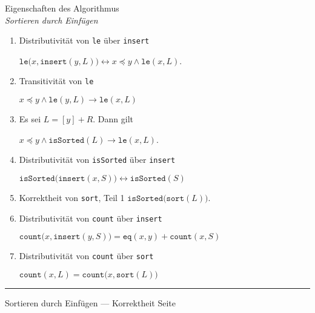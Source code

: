 \documentclass{slides}
\newcounter{mypage}
\begin{document}
\begin{slide}{}
\normalsize

\begin{center}
Eigenschaften des Algorithmus \\ \emph{Sortieren durch Einf\"ugen}
\end{center}
\vspace*{0.5cm}

\footnotesize
\begin{enumerate}
\item Distributivit\"at von \texttt{le} \"uber \texttt{insert}

      $\mathtt{le}\bigl(x, \mathtt{insert}(y,L) \bigr) \leftrightarrow x \preceq y \wedge \mathtt{le}(x,L)$. 
\item Transitivit\"at von \texttt{le}

      $x \preceq y \wedge \mathtt{le}(y,L) \rightarrow \mathtt{le}(x,L)$

\item Es sei $L = [y] + R$. Dann gilt 

      $x \preceq y \wedge \mathtt{isSorted}(L) \rightarrow \mathtt{le}(x,L)$.

\item Distributivit\"at von \texttt{isSorted} \"uber \texttt{insert}

      $\mathtt{isSorted}\bigl(\mathtt{insert}(x,S) \bigr) \leftrightarrow \mathtt{isSorted}(S)$
\item Korrektheit von \texttt{sort}, Teil 1
      $\mathtt{isSorted}\bigl(\mathtt{sort}(L) \bigr)$. 
\item Distributivit\"at von \texttt{count} \"uber \texttt{insert}

      $\mathtt{count}\bigl(x, \mathtt{insert}(y, S) \bigr) = \mathtt{eq}(x,y) + \mathtt{count}(x,S)$
\item Distributivit\"at von \texttt{count} \"uber \texttt{sort} 

      $\texttt{count}(x,L) = \texttt{count}\bigl(x, \texttt{sort}(L) \bigr)$
\end{enumerate}

\vspace*{\fill}
\tiny \addtocounter{mypage}{1}
\rule{17cm}{1mm}
Sortieren durch Einf\"ugen --- Korrektheit \hspace*{\fill} Seite 
\end{slide}

\end{document}
